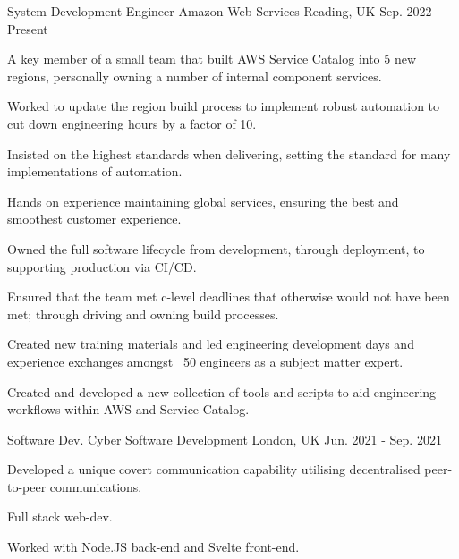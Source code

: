 



\begin{cventries}


\cventry
{System Development Engineer} %
{Amazon Web Services} %
{Reading, UK} %
{Sep. 2022 - Present} %
{ %
\begin{cvitems}
\item {A key member of a small team that built AWS Service Catalog into 5 new regions, personally owning a number of internal component services.}
\item {Worked to update the region build process to implement robust automation to cut down engineering hours by a factor of 10.}
\item {Insisted on the highest standards when delivering, setting the standard for many implementations of automation.}
\item {Hands on experience maintaining global services, ensuring the best and smoothest customer experience.}
\item {Owned the full software lifecycle from development, through deployment, to supporting production via CI/CD.}
\item {Ensured that the team met c-level deadlines that otherwise would not have been met; through driving and owning build processes.}
\item {Created new training materials and led engineering development days and experience exchanges amongst ~50 engineers as a subject matter expert.}
\item {Created and developed a new collection of tools and scripts to aid engineering workflows within AWS and Service Catalog.}
\end{cvitems}
}


\cventry
{Software Dev.} %
{Cyber Software Development} %
{London, UK} %
{Jun. 2021 - Sep. 2021} %
{ %
\begin{cvitems}
\item {Developed a unique covert communication capability utilising decentralised peer-to-peer communications.}
\item {Full stack web-dev.}
\item {Worked with Node.JS back-end and Svelte front-end.}
\end{cvitems}
}


\end{cventries}

